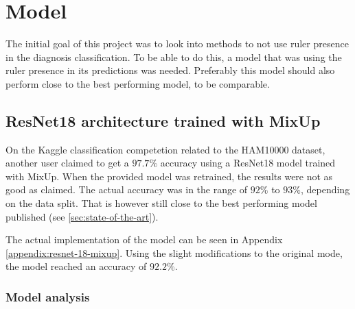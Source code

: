 \chapter{Model}
The initial goal of this project was to look into methods to not use ruler presence in the
diagnosis classification.
To be able to do this, a model that was using the ruler presence in its predictions was needed.
Preferably this model should also perform close to the best performing model, to be comparable.

\section{ResNet18 architecture trained with MixUp}
On the Kaggle classification competetion related to the HAM10000 dataset\cite{HAM10000-kaggle-competetion},
another user claimed to get a $97.7\%$ accuracy using a ResNet18 model trained with MixUp\cite{kaggle-97-model}.
When the provided model was retrained, the results were not as good as claimed.
The actual accuracy was in the range of $92\%$ to $93\%$, depending on the data split.
That is however still close to the best performing model published (see \ref{sec:state-of-the-art}).

The actual implementation of the model can be seen in Appendix \ref{appendix:resnet-18-mixup}.
Using the slight modifications to the original mode, the model reached an accuracy of $92.2\%$.

\subsection{Model analysis}
